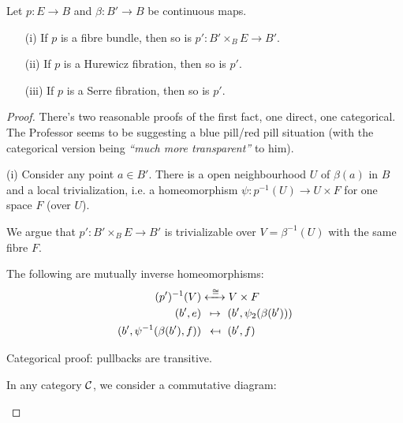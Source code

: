 \begin{theorem}
Let $p:E\to B$ and $\beta:B'\to B$ be continuous maps.
\begin{itemize}
    \item[(i)] If $p$ is a fibre bundle, then so is $p':B'\times_B E\to B'$.
    \item[(ii)] If $p$ is a Hurewicz fibration, then so is $p'$.
    \item[(iii)] If $p$ is a Serre fibration, then so is $p'$.
\end{itemize}
\end{theorem}

\begin{proof}There's two reasonable proofs of the first fact, one direct, one categorical. The Professor seems to be suggesting a blue pill/red pill situation (with the categorical version being \emph{\enquote{much more transparent}} to him).

(i) Consider any point $a\in B'$. There is a open neighbourhood $U$ of $\beta(a)$ in $B$ and a local trivialization, i.e. a homeomorphism $\psi:p^{-1}(U)\to U\times F$ for one space $F$ (over $U$).

We argue that $p':B'\times_B E\to B'$ is trivializable over $V=\beta^{-1}(U)$ with the same fibre $F$.

The following are mutually inverse homeomorphisms:
\begin{align*}
    (p')^{-1}(V)&\xleftrightarrow{\ \cong\ }V\times F\\
    (b',e)&\ \,\mapsto\ (b',\psi_2(\beta(b')))\\
    (b',\psi^{-1}(\beta(b'),f))&\ \,\mapsfrom\ (b',f)
\end{align*}

Categorical proof: pullbacks are transitive.

In any category $\mathcal{C}$, we consider a commutative diagram:
\begin{center}
\end{center}


\end{proof}
